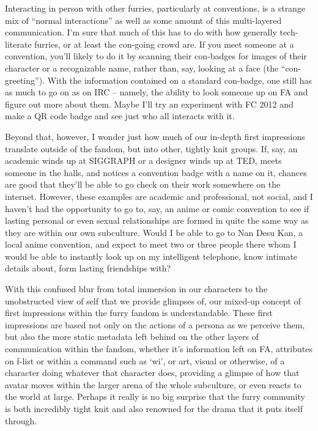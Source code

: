 Interacting in person with other furries, particularly at conventions, is a strange mix of “normal interactions” as well as some amount of this multi-layered communication. I’m sure that much of this has to do with how generally tech-literate furries, or at least the con-going crowd are.  If you meet someone at a convention, you’ll likely to do it by scanning their con-badges for images of their character or a recognizable name, rather than, say, looking at a face (the “con-greeting”).  With the information contained on a standard con-badge, one still has as much to go on as on IRC -- namely, the ability to look someone up on FA and figure out more about them.  Maybe I’ll try an experiment with FC 2012 and make a QR code badge and see just who all interacts with it.

Beyond that, however, I wonder just how much of our in-depth first impressions translate outside of the fandom, but into other, tightly knit groups.  If, say, an academic winds up at SIGGRAPH or a designer winds up at TED, meets someone in the halls, and notices a convention badge with a name on it, chances are good that they’ll be able to go check on their work somewhere on the internet.  However, these examples are academic and professional, not social, and I haven’t had the opportunity to go to, say, an anime or comic convention to see if lasting personal or even sexual relationships are formed in quite the same way as they are within our own subculture.  Would I be able to go to Nan Desu Kan, a local anime convention, and expect to meet two or three people there whom I would be able to instantly look up on my intelligent telephone, know intimate details about, form lasting friendships with?

With this confused blur from total immersion in our characters to the unobstructed view of self that we provide glimpses of, our mixed-up concept of first impressions within the furry fandom is understandable.  These first impressions are based not only on the actions of a persona as we perceive them, but also the more static metadata left behind on the other layers of communication within the fandom, whether it’s information left on FA, attributes on f-list or within a command such as `wi’, or art, visual or otherwise, of a character doing whatever that character does, providing a glimpse of how that avatar moves within the larger arena of the whole subculture, or even reacts to the world at large.  Perhaps it really is no big surprise that the furry community is both incredibly tight knit and also renowned for the drama that it puts itself through.
